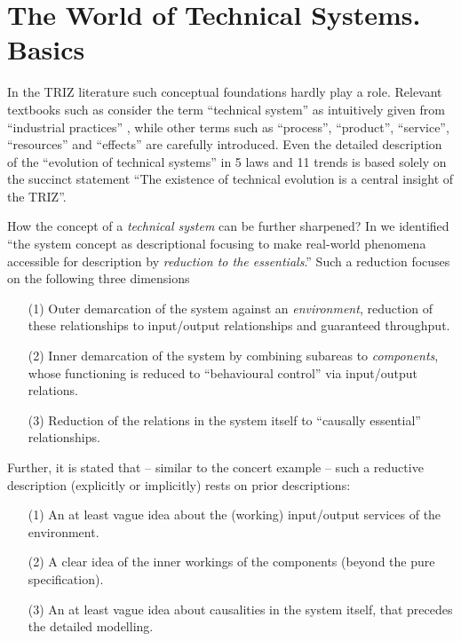 \documentclass[11pt,a4paper]{article}
\begin{document}
\section{The World of Technical Systems. Basics}

In the TRIZ literature such conceptual foundations hardly play a role.
Relevant textbooks such as \cite{KS2017} consider the term ``technical
system'' as intuitively given from ``industrial practices'' \cite
[p. 2]{KS2017}, while other terms such as ``process'', ``product'',
``service'', ``resources'' and ``effects'' \cite[p. 6--10]{KS2017} are
carefully introduced. Even the detailed description of the ``evolution of
technical systems'' in 5 laws and 11 trends \cite[Section 4.8]{KS2017} is
based solely on the succinct statement ``The existence of technical evolution
is a central insight of the TRIZ''. 

How the concept of a \emph{technical system} can be further sharpened?  In
\cite{Graebe2020a} we identified ``the system concept as descriptional
focusing to make real-world phenomena accessible for description by
\emph{reduction to the essentials}.'' Such a reduction focuses on the
following three dimensions \cite[p. 18]{Graebe2020a}
\begin{itemize}[noitemsep]
\item [(1)] Outer demarcation of the system against an \emph{environment},
  reduction of these relationships to input/output relationships and
  guaranteed throughput.
\item [(2)] Inner demarcation of the system by combining subareas to
  \emph{components}, whose functioning is reduced to ``behavioural control''
  via input/output relations.
\item [(3)] Reduction of the relations in the system itself to ``causally
  essential'' relationships.
\end{itemize}
Further, it is stated that -- similar to the concert example -- such a
reductive description (explicitly or implicitly) rests on prior descriptions:
\begin{enumerate}
\item[(1)] An at least vague idea about the (working) input/output services of
  the environment.
\item[(2)] A clear idea of the inner workings of the components (beyond the
  pure specification).
\item[(3)] An at least vague idea about causalities in the system itself, that
  precedes the detailed modelling.
\end{enumerate}
\end{document}
